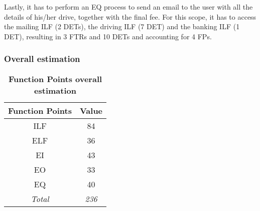 Lastly, it has to perform an EQ process to send an email to the user with all the details of his/her drive, together with the final fee. For this scope, it has to access the mailing ILF (2 DETs), the driving ILF (7 DET) and the banking ILF (1 DET), resulting in 3 FTRs and 10 DETs and accounting for 4 FPs.


\subsubsection{Overall estimation}
\begin{longtable}{| c | c |}
	\caption{\textbf{Function Points overall estimation}} %
	\label{tab:fp_results}%
	\\ \hline %
	
	\textbf{Function Points } & \textbf{Value} \\ \hline
	ILF & 84 \\ \hline
	ELF & 36 \\ \hline
	EI & 43 \\ \hline
	EO & 33 \\ \hline
	EQ & 40 \\ \hline
	\emph{Total} & \emph{236} \\ \hline
\end{longtable}

